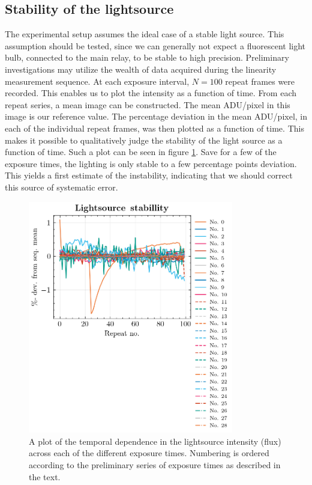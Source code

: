 \documentclass[../main.tex]{subfiles}
\begin{document}
		\subsection{Stability of the lightsource}
		The experimental setup assumes the ideal case of a stable light source. This assumption should be tested, since we can generally not expect a fluorescent light bulb, connected to the main relay, to be stable to high precision. Preliminary investigations may utilize the wealth of data acquired during the linearity measurement sequence. At each exposure interval, $N = 100$ repeat frames were recorded. This enables us to plot the intensity as a function of time. From each repeat series, a mean image can be constructed. The mean ADU/pixel in this image is our reference value. The percentage deviation in the mean ADU/pixel, in each of the individual repeat frames, was then plotted as a function of time. This makes it possible to qualitatively judge the stability of the light source as a function of time. Such a plot can be seen in figure \ref{fig:lightsourcestability}. Save for a few of the exposure times, the lighting is only stable to a few percentage points deviation. This yields a first estimate of the instability, indicating that we should correct this source of systematic error. 
		
		\begin{figure}
			\centering			\includegraphics[width=0.8\textwidth]{lightsource.png}
			\caption{A plot of the temporal dependence in the lightsource intensity (flux) across each of the different exposure times. Numbering is ordered according to the preliminary series of exposure times as described in the text.}
			\label{fig:lightsourcestability}
		\end{figure}
		
\end{document}
